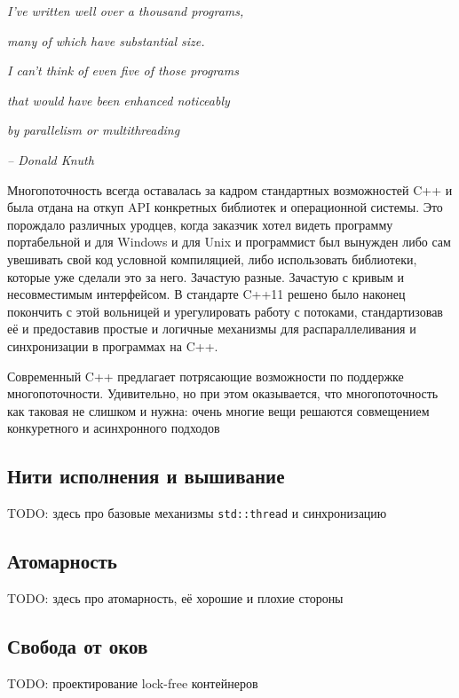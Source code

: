 \documentclass[a4paper,12pt,oneside]{article}
\begin{document}
\hfill\textit{I’ve written well over a thousand programs,}

\hfill\textit{many of which have substantial size.}

\hfill\textit{I can’t think of even five of those programs}

\hfill\textit{that would have been enhanced noticeably}

\hfill\textit{by parallelism or multithreading}{\vspace{0.5em}}

\hfill\textit{-- Donald Knuth}

Многопоточность всегда оставалась за кадром стандартных возможностей C++ и была отдана на откуп API конкретных библиотек и операционной системы. Это порождало различных уродцев, когда заказчик хотел видеть программу портабельной и для Windows и для Unix и программист был вынужден либо сам увешивать свой код условной компиляцией, либо использовать библиотеки, которые уже сделали это за него. Зачастую разные. Зачастую с кривым и несовместимым интерфейсом. В стандарте C++11 решено было наконец покончить с этой вольницей и урегулировать работу с потоками, стандартизовав её и предоставив простые и логичные механизмы для распараллеливания и синхронизации в программах на C++.

Современный C++ предлагает потрясающие возможности по поддержке многопоточности. Удивительно, но при этом оказывается, что многопоточность как таковая не слишком и нужна: очень многие вещи решаются совмещением конкуретного и асинхронного подходов

\pagebreak
\subsection{Нити исполнения и вышивание}

TODO: здесь про базовые механизмы \lstinline!std::thread! и синхронизацию

\pagebreak
\subsection{Атомарность}

TODO: здесь про атомарность, её хорошие и плохие стороны

\pagebreak
\subsection{Свобода от оков}

TODO: проектирование lock-free контейнеров
\end{document}

